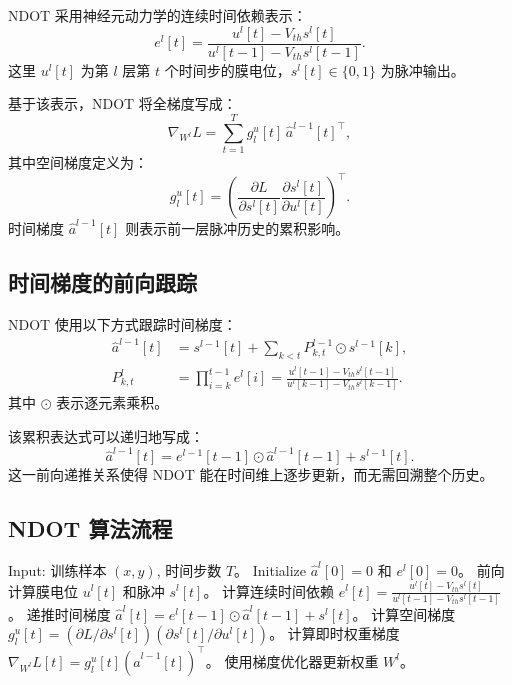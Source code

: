 \documentclass[journal,12pt,onecolumn]{IEEEtran}
\begin{document}
NDOT 采用神经元动力学的连续时间依赖表示：
\begin{equation}
  e^l[t] = \frac{u^l[t]-V_{th}s^l[t]}{u^l[t-1]-V_{th}s^l[t-1]}.
\end{equation}
这里 $u^l[t]$ 为第 $l$ 层第 $t$ 个时间步的膜电位，$s^l[t]\in\{0,1\}$ 为脉冲输出。

基于该表示，NDOT 将全梯度写成：
\begin{equation}
  \nabla_{W^l}L = \sum_{t=1}^T g^u_l[t] \, \hat{a}^{l-1}[t]^\top,
\end{equation}
其中空间梯度定义为：
\begin{equation}
  g^u_l[t] = \left(\frac{\partial L}{\partial s^l[t]} \frac{\partial s^l[t]}{\partial u^l[t]}\right)^\top.
\end{equation}
时间梯度 $\hat{a}^{l-1}[t]$ 则表示前一层脉冲历史的累积影响。

\subsection{时间梯度的前向跟踪}
NDOT 使用以下方式跟踪时间梯度：
\begin{align}
  \hat a^{l-1}[t] &= s^{l-1}[t] + \sum_{k<t} P^{l-1}_{k,t} \odot s^{l-1}[k], \\
  P^{l}_{k,t} &= \prod_{i=k}^{t-1} e^l[i] = \frac{u^l[t-1]-V_{th}s^l[t-1]}{u^l[k-1]-V_{th}s^l[k-1]}.
\end{align}
其中 $\odot$ 表示逐元素乘积。

该累积表达式可以递归地写成：
\begin{equation}
  \hat a^{l-1}[t] = e^{l-1}[t-1] \odot \hat a^{l-1}[t-1] + s^{l-1}[t].
\end{equation}
这一前向递推关系使得 NDOT 能在时间维上逐步更新，而无需回溯整个历史。

\subsection{NDOT 算法流程}
\begin{algorithm}[htbp]
\caption{NDOT 一次迭代}
\begin{algorithmic}[1]
  \STATE Input: 训练样本 $(x,y)$, 时间步数 $T$。
  \STATE Initialize $\hat a^l[0]=0$ 和 $e^l[0]=0$。
      \STATE 前向计算膜电位 $u^l[t]$ 和脉冲 $s^l[t]$。
      \STATE 计算连续时间依赖 $e^l[t] = \frac{u^l[t]-V_{th}s^l[t]}{u^l[t-1]-V_{th}s^l[t-1]}$。
      \STATE 递推时间梯度 $\hat a^l[t] = e^l[t-1] \odot \hat a^l[t-1] + s^l[t]$。
    \ENDFOR
      \STATE 计算空间梯度 $g^u_l[t] = (\partial L / \partial s^l[t])(\partial s^l[t] / \partial u^l[t])$。
      \STATE 计算即时权重梯度 $\nabla_{W^l}L[t] = g^u_l[t](\hat a^{l-1}[t])^\top$。
      \STATE 使用梯度优化器更新权重 $W^l$。
    \ENDFOR
  \ENDFOR
\end{algorithmic}
\end{algorithm}
\end{document}
